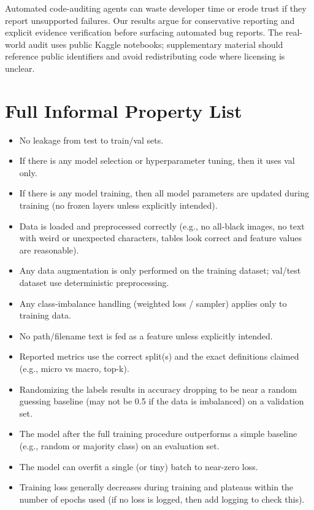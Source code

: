 \documentclass[11pt]{article}
\begin{document}
Automated code-auditing agents can waste developer time or erode trust if they report unsupported failures.
Our results argue for conservative reporting and explicit evidence verification before surfacing automated bug reports.
The real-world audit uses public Kaggle notebooks; supplementary material should reference public identifiers and avoid redistributing code where licensing is unclear.

\FloatBarrier



\appendix
\section{Full Informal Property List}
\label{app:properties}

{\setlength{\itemsep}{0.2em}
\begin{itemize}
  \item No leakage from test to train/val sets.
  \item If there is any model selection or hyperparameter tuning, then it uses val only.
  \item If there is any model training, then all model parameters are updated during training (no frozen layers unless explicitly intended).
  \item Data is loaded and preprocessed correctly (e.g., no all-black images, no text with weird or unexpected characters, tables look correct and feature values are reasonable).
  \item Any data augmentation is only performed on the training dataset; val/test dataset use deterministic preprocessing.
  \item Any class-imbalance handling (weighted loss / sampler) applies only to training data.
  \item No path/filename text is fed as a feature unless explicitly intended.
  \item Reported metrics use the correct split(s) and the exact definitions claimed (e.g., micro vs macro, top-k).
  \item Randomizing the labels results in accuracy dropping to be near a random guessing baseline (may not be 0.5 if the data is imbalanced) on a validation set.
  \item The model after the full training procedure outperforms a simple baseline (e.g., random or majority class) on an evaluation set.
  \item The model can overfit a single (or tiny) batch to near-zero loss.
  \item Training loss generally decreases during training and plateaus within the number of epochs used (if no loss is logged, then add logging to check this).

\end{itemize}}
\end{document}
